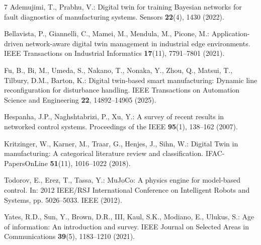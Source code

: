 \begin{thebibliography}{7}
Ademujimi, T., Prabhu, V.: Digital twin for training Bayesian networks for fault diagnostics of manufacturing systems. Sensors \textbf{22}(4), 1430 (2022). 

Bellavista, P., Giannelli, C., Mamei, M., Mendula, M., Picone, M.: Application-driven network-aware digital twin management in industrial edge environments. IEEE Transactions on Industrial Informatics \textbf{17}(11), 7791--7801 (2021). 

Fu, B., Bi, M., Umeda, S., Nakano, T., Nonaka, Y., Zhou, Q., Matsui, T., Tilbury, D.M., Barton, K.: Digital twin-based smart manufacturing: Dynamic line reconfiguration for disturbance handling. IEEE Transactions on Automation Science and Engineering \textbf{22}, 14892--14905 (2025). 

Hespanha, J.P., Naghshtabrizi, P., Xu, Y.: A survey of recent results in networked control systems. Proceedings of the IEEE \textbf{95}(1), 138--162 (2007). 

Kritzinger, W., Karner, M., Traar, G., Henjes, J., Sihn, W.: Digital Twin in manufacturing: A categorical literature review and classification. IFAC-PapersOnLine \textbf{51}(11), 1016--1022 (2018). 

Todorov, E., Erez, T., Tassa, Y.: MuJoCo: A physics engine for model-based control. In: 2012 IEEE/RSJ International Conference on Intelligent Robots and Systems, pp. 5026--5033. IEEE (2012). 

Yates, R.D., Sun, Y., Brown, D.R., III, Kaul, S.K., Modiano, E., Ulukus, S.: Age of information: An introduction and survey. IEEE Journal on Selected Areas in Communications \textbf{39}(5), 1183--1210 (2021). 
\end{thebibliography}

